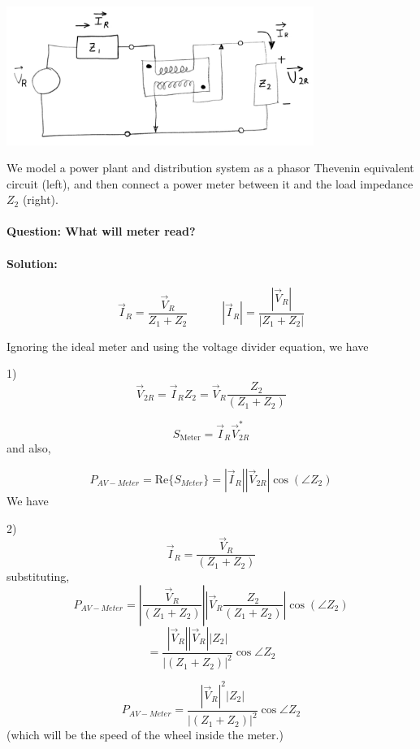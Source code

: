 \begin{ExampleSmall}

\includegraphics[width=100mm]{figsChapt03/GD42554.png}

We model a power plant and distribution system as a phasor Thevenin equivalent
circuit (left), and then connect a power meter between it and the load impedance $Z_2$
(right).

\vspace{0.2in}
\paragraph{Question: What will meter read?}

\end{ExampleSmall}
\begin{ExampleCont}

\paragraph{Solution:}
\[
\vec{I}_R = \frac{\vec{V}_R}{Z_1 + Z_2} \quad\quad\quad |\vec{I}_R| = \frac{|\vec{V}_R|}{| {Z}_1 +  {Z}_2|}
\]

Ignoring the ideal meter and using the voltage divider equation, we have

\hspace {1.75in} 1)
\[
\vec{V}_{2R} = \vec{I}_R Z_2 = \vec V_R \frac{Z_2}{(Z_1 + Z_2)}
\]


\[
S_{\text{Meter}} = \vec{I}_R\vec{V}_{2R}^*
\]
and also,

\[
P_{AV-Meter} = \mathrm{Re} \{S_{Meter}\} = |\vec I_R||\vec V_{2R}|\cos(\angle Z_2)
\]
We have


\hspace {1.75in} 2)
\[
\vec I_R = \frac {\vec V_{R}} {(Z_1+Z_2)}
\]
substituting,
\[
P_{AV-Meter} = \left |   \frac {\vec V_{R}}   {(Z_1+Z_2)}   \right |
\left | \vec V_R \frac{Z_2}{(Z_1 + Z_2)} \right | \cos(\angle Z_2)
\]
\[
= \frac{|\vec{V}_R| |\vec{V}_R| |Z_2|}
       {|(Z_1 + Z_2)|^2} \cos \angle Z_2
\]

\[\boxed{
P_{AV-Meter} = \frac{|\vec{V}_R|^2 |Z_2|}
                    {|(Z_1 + Z_2)|^2} \cos \angle Z_2
}
\]
(which will be the speed of the wheel inside the meter.)

\end{ExampleCont}










